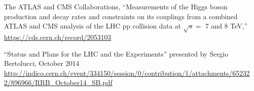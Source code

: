 \singlespacing

\begin{thebibliography}{100}

The ATLAS and CMS Collaborations,
  ``Measurements of the Higgs boson production and decay rates and constraints on its couplings from a combined ATLAS and CMS analysis of the LHC pp collision data at $\sqrt{s} =$ 7 and 8 TeV,''
  \url{https://cds.cern.ch/record/2053103}

 ``Status and Plans for the LHC and the Experiments'' presented by Sergio Bertolucci, October 2014\\
\url{http://indico.cern.ch/event/334150/session/0/contribution/1/attachments/652322/896966/RRB_October14_SB.pdf}

\end{thebibliography}
\newpage{\pagestyle{empty}\cleardoublepage}
